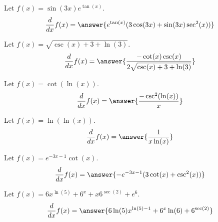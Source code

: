 \documentclass{ximera}
\begin{document}
\begin{shuffle}
\begin{exercise}
\begin{exercise}
Let $f(x)=\sin (3 x) e^{\tan (x)}$.
\[
\ddx f(x) = \answer{e^{\tan (x)} (3 \cos (3 x)+\sin (3 x) \sec ^2(x))}
\]
\end{exercise}

\begin{exercise}
Let $f(x)=\sqrt{\csc (x)+3+\ln (3)}$.
\[
\ddx f(x) = \answer{\frac{-\cot (x) \csc (x)}{2 \sqrt{\csc (x)+3+\ln (3)}}}
\]
\end{exercise}

\begin{exercise}
Let $f(x)=\cot (\ln (x))$.
\[
\ddx f(x) = \answer{\frac{-\csc ^2(\ln (x))}{x}}
\]
\end{exercise}

\begin{exercise}
Let $f(x)=\ln (\ln (x))$.
\[
\ddx f(x) = \answer{\frac{1}{x \ln (x)}}
\]
\end{exercise}

\begin{exercise}
Let $f(x)=e^{-3 x-1} \cot (x)$.
\[
\ddx f(x) = \answer{-e^{-3 x-1} (3 \cot (x)+\csc ^2(x))}
\]
\end{exercise}



\begin{exercise}
Let $f(x)=6 x^{\ln (5)}+6^x+x 6^{\sec (2)}+e^6$.
\[
\ddx f(x) = \answer{6 \ln (5) x^{\ln (5)-1}+6^x \ln (6)+6^{\sec (2)}}
\]
\end{exercise}




\end{exercise}
\end{shuffle}
\end{document}
